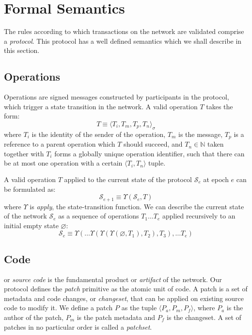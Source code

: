 \section{Formal Semantics}

The rules according to which transactions on the \oscoin{} network are
validated comprise a \emph{protocol}. This protocol has a well defined semantics
which we shall describe in this section.

\subsection{Operations}

Operations are signed messages constructed by participants in the protocol,
which trigger a state transition in the network. A valid operation $T$ takes
the form:
\[
    T \equiv \langle T_i, T_m, T_p, T_n \rangle_{\sigma}
\]
where $T_i$ is the identity of the sender of the operation, $T_m$ is the
message, $T_p$ is a reference to a parent operation which $T$ should succeed,
and $T_n \in \mathbb{N}$ taken together with $T_i$ forms a globally unique
operation identifier, such that there can be at most one operation with a
certain $\langle T_i, T_n \rangle$ tuple.

A valid operation $T$ applied to the current state of
the protocol $\mathcal{S}_e$ at epoch $e$ can be formulated as:
\[
    \mathcal{S}_{e+1} \equiv \Upsilon(\mathcal{S}_e, T)
\]
where $\Upsilon$ is \emph{apply}, the state-transition function.  We can
describe the current state of the network $\mathcal{S}_e$ as a sequence of
operations ${T_1 \dots T_e}$ applied recursively to an initial empty state
$\varnothing$:
\[
    \mathcal{S}_e \equiv \Upsilon(\dots \Upsilon(\Upsilon(\Upsilon(\varnothing,
    T_1), T_2), T_3), \dots T_e)
\]

\subsection{Code} or \emph{source code} is the fundamental product or
\emph{artifact} of the \oscoin{} network. Our protocol defines the \emph{patch}
primitive as the atomic unit of code. A patch is a set of metadata and code
changes, or \emph{changeset}, that can be applied on existing source
code to modify it. We define a patch $P$ as the tuple $\langle P_a, P_m, P_f
\rangle$, where $P_a$ is the author of the patch, $P_m$ is the patch metadata
and $P_f$ is the changeset. A set of patches in no particular order is called a
\emph{patchset}.

